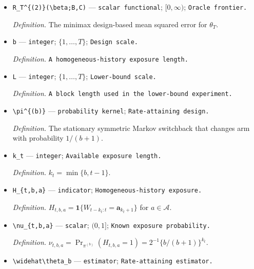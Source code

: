 \documentclass{article}
\begin{document}
\begin{itemize}
  \par\smallskip\noindent\emph{Definition.} \texttt{The bounded pointwise polynomial historical-\allowbreak{}envelope class.}
  \item \texttt{R\_\allowbreak{}T\textasciicircum{}\{(2)\}\allowbreak{}(\textbackslash{}\allowbreak{}beta;\allowbreak{}B,\allowbreak{}C)} --- \texttt{scalar functional}; \([0,\infty)\); \texttt{Oracle frontier.}
  \par\smallskip\noindent\emph{Definition.} The minimax design-based mean squared error for \(\theta_T\).
  \item \texttt{b} --- \texttt{integer}; \(\{1,\ldots,T\}\); \texttt{Design scale.}
  \par\smallskip\noindent\emph{Definition.} \texttt{A homogeneous-\allowbreak{}history exposure length.}
  \item \texttt{L} --- \texttt{integer}; \(\{1,\ldots,T\}\); \texttt{Lower-\allowbreak{}bound scale.}
  \par\smallskip\noindent\emph{Definition.} \texttt{A block length used in the lower-\allowbreak{}bound experiment.}
  \item \texttt{\textbackslash{}\allowbreak{}pi\textasciicircum{}\{(b)\}\allowbreak{}} --- \texttt{probability kernel}; \texttt{Rate-\allowbreak{}attaining design.}
  \par\smallskip\noindent\emph{Definition.} The stationary symmetric Markov switchback that changes arm with probability \(1/(b+1)\).
  \item \texttt{k\_\allowbreak{}t} --- \texttt{integer}; \texttt{Available exposure length.}
  \par\smallskip\noindent\emph{Definition.} \(k_t=\min\{b,t-1\}\).
  \item \texttt{H\_\allowbreak{}\{t,\allowbreak{}b,\allowbreak{}a\}\allowbreak{}} --- \texttt{indicator}; \texttt{Homogeneous-\allowbreak{}history exposure.}
  \par\smallskip\noindent\emph{Definition.} \(H_{t,b,a}=\mathbf 1\{W_{t-k_t:t}=\mathbf a_{k_t+1}\}\) for \(a\in\mathcal A\).
  \item \texttt{\textbackslash{}\allowbreak{}nu\_\allowbreak{}\{t,\allowbreak{}b,\allowbreak{}a\}\allowbreak{}} --- \texttt{scalar}; \((0,1]\); \texttt{Known exposure probability.}
  \par\smallskip\noindent\emph{Definition.} \(\nu_{t,b,a}=\Pr_{\pi^{(b)}}(H_{t,b,a}=1)=2^{-1}\{b/(b+1)\}^{k_t}\).
  \item \texttt{\textbackslash{}\allowbreak{}widehat\textbackslash{}\allowbreak{}theta\_\allowbreak{}b} --- \texttt{estimator}; \texttt{Rate-\allowbreak{}attaining estimator.}

\end{itemize}
\end{document}
